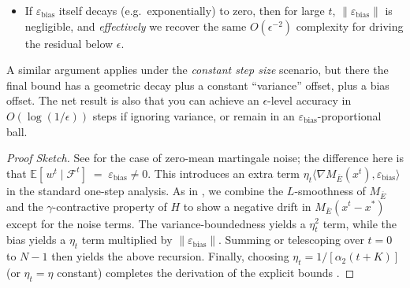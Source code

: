 \begin{theorem}
\begin{itemize}
\item If \(\varepsilon_{\text{bias}}\) itself decays (e.g.\ exponentially) to zero, then for large \(t\), \(\|\varepsilon_{\text{bias}}\|\) is negligible, and \emph{effectively} we recover the same \(O(\epsilon^{-2})\) complexity for driving the residual below \(\epsilon\). 
\end{itemize}
A similar argument applies under the \emph{constant step size} scenario, but there the final bound has a geometric decay plus a constant ``variance'' offset, plus a bias offset.  The net result is also that you can achieve an \(\epsilon\)-level accuracy in \(O(\log(1/\epsilon))\) steps if ignoring variance, or remain in an \(\varepsilon_{\text{bias}}\)-proportional ball.

\end{theorem}

\begin{proof}[Proof Sketch]
See \citep{zhang2021finite} for the case of zero-mean martingale noise; the difference here is that 
\(\mathbb{E}[\,w^t \mid \mathcal{F}^t] \;=\;\varepsilon_{\text{bias}}\neq 0\).  
This introduces an extra term \(\eta_t \langle \nabla M_{\overline{E}}(x^t),\varepsilon_{\text{bias}}\rangle\) in the standard one-step analysis.  As in \citep[Lem.\,5]{zhang2021finite}, we combine the $L$-smoothness of \(M_{\overline{E}}\) and the $\gamma$-contractive property of \(H\) to show a negative drift in $M_{\overline{E}}(x^t-x^*)$ except for the noise terms.  The variance-boundedness yields a $\eta_t^2$ term, while the bias yields a $\eta_t$ term multiplied by $\|\varepsilon_{\text{bias}}\|$.  Summing or telescoping over $t=0$ to $N-1$ then yields the above recursion.  Finally, choosing $\eta_t=1/[\alpha_2(t+K)]$ (or $\eta_t=\eta$ constant) completes the derivation of the explicit bounds \citep[see also Eq.\,(B.8)--(B.9)]{zhang2021finite}.
\end{proof}




